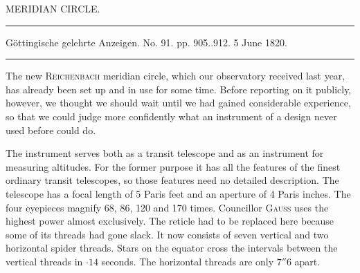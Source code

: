\clearpage
{}
\hypertarget{native-434-part-lower}{}
\begin{center}
{\Large MERIDIAN CIRCLE.}

\rule{0.6\linewidth}{0.4pt}

Göttingische gelehrte Anzeigen. No. 91. pp. 905..912. 5 June 1820.

\rule{0.6\linewidth}{0.4pt}
\end{center}

The new \textsc{Reichenbach} meridian circle, which our observatory received last year, has already been set up and in use for some time. Before reporting on it publicly, however, we thought we should wait until we had gained considerable experience, so that we could judge more confidently what an instrument of a design never used before could do.

The instrument serves both as a transit telescope and as an instrument for measuring altitudes. For the former purpose it has all the features of the finest ordinary transit telescopes, so those features need no detailed description. The telescope has a focal length of 5 Paris feet and an aperture of 4 Paris inches. The four eyepieces magnify 68, 86, 120 and 170 times. Councillor \textsc{Gauss} uses the highest power almost exclusively. The reticle had to be replaced here because some of its threads had gone slack. It now consists of seven vertical and two horizontal spider threads. Stars on the equator cross the intervals between the vertical threads in $\cdot 14$ seconds. The horizontal threads are only $7''6$ apart.

